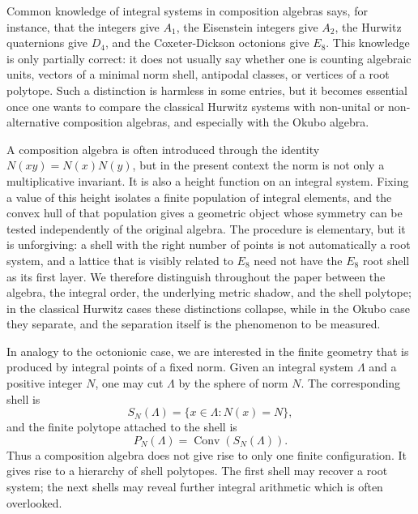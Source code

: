 \documentclass{birkjour}
\newcommand{\Conv}{\operatorname{Conv}}
\numberwithin{equation}{section}
\begin{document}
Common knowledge of integral systems in composition algebras says,
for instance, that the integers give \(A_1\), the Eisenstein integers give
\(A_2\), the Hurwitz quaternions give \(D_4\), and the Coxeter-Dickson
octonions give \(E_8\). This knowledge is only partially  correct: it
does not usually say whether one is counting algebraic units, vectors of a
minimal norm shell, antipodal classes, or vertices of a root polytope. Such a
distinction is harmless in some entries, but it becomes essential once one
wants to compare the classical Hurwitz systems with non-unital or non-
alternative composition algebras, and especially with the Okubo algebra. 

A composition algebra
is often introduced through the identity \(N(xy)=N(x)N(y)\), but in the present
context the norm is not only a multiplicative invariant. It is also a height
function on an integral system. Fixing a value of this height isolates a finite
population of integral elements, and the convex hull of that population gives a
geometric object whose symmetry can be tested independently of the original
algebra. The procedure is elementary, but it is unforgiving: a shell with the
right number of points is not automatically a root system, and a lattice that
is visibly related to \(E_8\) need not have the \(E_8\) root shell as its first
layer. We therefore distinguish throughout the paper between the algebra, the
integral order, the underlying metric shadow, and the shell polytope; in the
classical Hurwitz cases these distinctions collapse, while in the Okubo case
they separate, and the separation itself is the phenomenon to be measured.

In analogy to the octonionic case, we are interested in the finite geometry
that is produced by integral points of a fixed norm. Given an integral system
\(\Lambda\) and a positive integer \(N\), one may cut \(\Lambda\) by the sphere
of norm \(N\). The corresponding shell is
\begin{equation}
S_N(\Lambda)=\{x\in\Lambda:N(x)=N\},
\end{equation}
and the finite polytope attached to the shell is
\begin{equation}
P_N(\Lambda)=\Conv(S_N(\Lambda)).
\end{equation}
Thus a composition algebra does not give rise to only one finite configuration.
It gives rise to a hierarchy of shell polytopes. The first shell may recover a
root system; the next shells may reveal further integral arithmetic which is
often overlooked.
\end{document}
